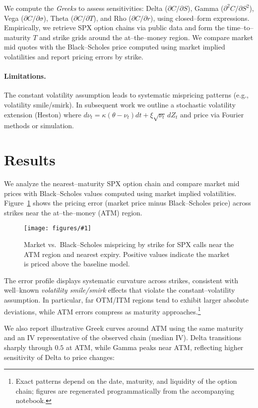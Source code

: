 \documentclass[12pt]{article}
\newcommand{\fig}[3]{%
\begin{figure}[h]
\centering
\texttt{[image: figures/\#1]}
\caption{#2}
\label{fig:#3}
\end{figure}}
\begin{document}
We compute the \emph{Greeks} to assess sensitivities: Delta ($\partial C/\partial S$), Gamma ($\partial^2 C/\partial S^2$),
Vega ($\partial C/\partial \sigma$), Theta ($\partial C/\partial T$), and Rho ($\partial C/\partial r$), using closed--form expressions.
Empirically, we retrieve SPX option chains via public data and form the time--to--maturity $T$ and strike grids around the at--the--money region.
We compare market mid quotes with the Black--Scholes price computed using market implied volatilities and report pricing errors by strike.

\paragraph{Limitations.} The constant volatility assumption leads to systematic mispricing patterns (e.g., volatility smile/smirk).
In subsequent work we outline a stochastic volatility extension (Heston) where $d\nu_t = \kappa(\theta-\nu_t)dt + \xi \sqrt{\nu_t}\, dZ_t$
and price via Fourier methods or simulation.

\section{Results}
We analyze the nearest--maturity SPX option chain and compare market mid prices with Black--Scholes values computed using market implied volatilities. Figure~\ref{fig:pricing-error} shows the pricing error (market price minus Black--Scholes price) across strikes near the at--the--money (ATM) region.

\fig{pricing_error_vs_strike.png}{Market vs.\ Black--Scholes mispricing by strike for SPX calls near the ATM region and nearest expiry. Positive values indicate the market is priced above the baseline model.}{pricing-error}

The error profile displays systematic curvature across strikes, consistent with well--known \emph{volatility smile/smirk} effects that violate the constant--volatility assumption. In particular, far OTM/ITM regions tend to exhibit larger absolute deviations, while ATM errors compress as maturity approaches.\footnote{Exact patterns depend on the date, maturity, and liquidity of the option chain; figures are regenerated programmatically from the accompanying notebook.}

We also report illustrative Greek curves around ATM using the same maturity and an IV representative of the observed chain (median IV). Delta transitions sharply through $0.5$ at ATM, while Gamma peaks near ATM, reflecting higher sensitivity of Delta to price changes:
\end{document}
